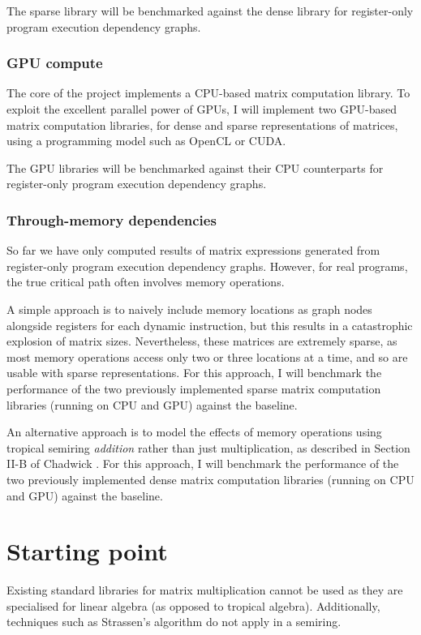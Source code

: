 \documentclass[a4paper,12pt]{article}
\begin{document}
The sparse library will be benchmarked against the dense library for register-only
program execution dependency graphs.

\subsubsection{GPU compute}
The core of the project implements a CPU-based matrix computation library.
To exploit the excellent parallel power of GPUs, I will implement two GPU-based matrix
computation libraries, for dense and sparse representations of matrices, using a
programming model such as OpenCL or CUDA.

The GPU libraries will be benchmarked against their CPU counterparts for register-only
program execution dependency graphs.

\subsubsection{Through-memory dependencies}
So far we have only computed results of matrix expressions generated from register-only
program execution dependency graphs. However, for real programs, the true critical path
often involves memory operations.

A simple approach is to naively include memory locations as graph nodes alongside
registers for each dynamic instruction, but this results in a catastrophic explosion of
matrix sizes. Nevertheless, these matrices are extremely sparse, as most memory operations
access only two or three locations at a time, and so are usable with sparse representations.
For this approach, I will benchmark the performance of the two previously implemented sparse
matrix computation libraries (running on CPU and GPU) against the baseline.

An alternative approach is to model the effects of memory operations using tropical semiring
\textit{addition} rather than just multiplication, as described in Section II-B of Chadwick \cite{Chadderz}.
For this approach, I will benchmark the performance of the two previously implemented dense
matrix computation libraries (running on CPU and GPU) against the baseline.

\section{Starting point}
Existing standard libraries for matrix multiplication cannot be used as they are
specialised for linear algebra (as opposed to tropical algebra).
Additionally, techniques such as Strassen's algorithm do not apply in a semiring.
\end{document}
